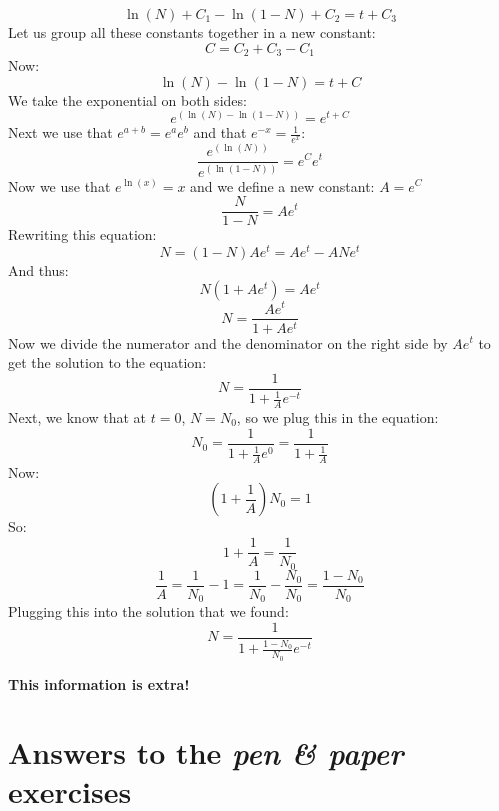 \documentclass{article}\usepackage[]{graphicx}\usepackage[]{color}
\begin{document}
\begin{equation}
\ln(N) + C_1 - \ln(1-N) + C_2 = t + C_3
\end{equation}
Let us group all these constants together in a new constant:
\begin{equation}
C = C_2 + C_3 - C_1
\end{equation}
Now:
\begin{equation}
\ln(N) - \ln(1-N) = t + C
\end{equation}
We take the exponential on both sides:
\begin{equation}
e^{\left(\ln(N) - \ln(1-N)\right)} = e^{t + C}
\end{equation}
Next we use that $e^{a+b} = e^a e^b$ and that $e^{-x}=\frac{1}{e^x}$:
\begin{equation}
\frac{e^{\left(\ln(N)\right)}}{e^{\left(\ln(1-N)\right)}} = e^C e^t
\end{equation}
Now we use that $e^{\ln(x)}=x$ and we define a new constant: $A=e^C$
\begin{equation}
\frac{N}{1-N} = A e^t
\end{equation}
Rewriting this equation:
\begin{equation}
N = (1-N) A e^t = A e^t - A N e^t
\end{equation}
And thus:
\begin{equation}
N (1+Ae^t) = A e^t
\end{equation}
\begin{equation}
N = \frac{Ae^t}{1+Ae^t}
\end{equation}
Now we divide the numerator and the denominator on the right side by $Ae^t$ to get the solution to the equation:
\begin{equation}
N = \frac{1}{1+\frac{1}{A}e^{-t}}
\end{equation}
Next, we know that at $t=0$, $N=N_0$, so we plug this in the equation:
\begin{equation}
N_0 = \frac{1}{1+\frac{1}{A}e^{0}} = \frac{1}{1+\frac{1}{A}}
\end{equation}
Now:
\begin{equation}
\left(1+\frac{1}{A}\right) N_0 = 1
\end{equation}
So:
\begin{equation}
1+\frac{1}{A} = \frac{1}{N_0}
\end{equation}
\begin{equation}
\frac{1}{A} = \frac{1}{N_0} -1 = \frac{1}{N_0} - \frac{N_0}{N_0} = \frac{1-N_0}{N_0} 
\end{equation}
Plugging this into the solution that we found:
\begin{equation}
N = \frac{1}{1+\frac{1-N_0}{N_0}e^{-t}}
\end{equation}

\textbf{This information is extra!\\}
\section{Answers to the \textit{pen \& paper} exercises}
\shipoutAnswer
\end{document}
